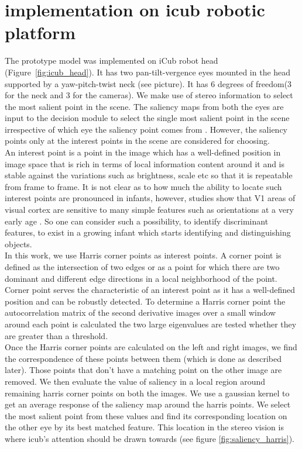 \documentclass[conference]{IEEEtran}
\begin{document}
\section{implementation on icub robotic platform}
The prototype model was implemented on iCub robot head
(Figure~\ref{fig:icub_head}). It has two pan-tilt-vergence eyes
mounted in the head supported by a yaw-pitch-twist neck (see
picture). It has 6 degrees of freedom(3 for the neck and 3 for the cameras).
We make use of stereo information to select the most salient point in the scene. The saliency maps from both the eyes are input to the decision module to select the single most salient point in the scene irrespective of which eye the saliency point comes from \cite{RichardWillInclude}. However, the saliency points only at the interest points in the scene are considered for choosing. \\
An interest point is a point in the image which has a well-defined position in image space that is rich in terms of local information content around it and is stable against the variations such as brightness, scale etc so that it is repeatable from frame to frame. It is not clear as to how much the ability to locate such interest points are pronounced in infants, however, studies show that V1 areas of visual cortex are sensitive to many simple features such as orientations at a very early age \cite{malsburg1973}. So one can consider such a possibility, to identify discriminant features, to exist in a growing infant which starts identifying and distinguishing objects.\\
In this work, we use Harris corner points as interest points. A corner point is defined as the intersection of two edges or as a point for which there are two dominant and different edge directions in a local neighborhood of the point. Corner point serves the characteristic of an interest point as it has a well-defined position and can be robustly detected. To determine a Harris corner point the autocorrelation matrix of the second derivative images over a small window around each point is calculated the two large eigenvalues are tested whether they are greater than a threshold.\\
Once the Harris corner points are calculated on the left and right images, we find the correspondence of these points between them (which is done as described later). Those points that don't have a matching point on the other image are removed. We then evaluate the value of saliency in a local region around remaining harris corner points on both the images. We use a gaussian kernel to get an average response of the saliency map around the harris points. We select the most salient point from these values and find its corresponding location on the other eye by its best matched feature. This location in the stereo vision is where icub's attention should be drawn towards (see figure \ref{fig:saliency_harris}).
\end{document}

